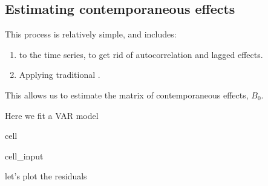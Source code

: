 \documentclass[letterpaper,10pt,english]{jupyterBook}
\begin{document}
\subsection{Estimating contemporaneous effects}
\label{\detokenize{notebooks/semiparametric_varlingam:estimating-contemporaneous-effects}}
\sphinxAtStartPar
This process is relatively simple, and includes:
\begin{enumerate}
%
\item {} 
\sphinxAtStartPar
{} to the time series, to get rid of autocorrelation and lagged effects.

\item {} 
\sphinxAtStartPar
Applying traditional .

\end{enumerate}

\sphinxAtStartPar
This allows us to estimate the matrix of contemporaneous effects, \(B_0\).

\sphinxAtStartPar
Here we fit a VAR model

\begin{sphinxuseclass}{cell}\begin{sphinxVerbatimInput}

\begin{sphinxuseclass}{cell_input}
\begin{sphinxVerbatim}[commandchars=\\\{\}]
   

  
    
  
\end{sphinxVerbatim}

\end{sphinxuseclass}\end{sphinxVerbatimInput}

\end{sphinxuseclass}
\sphinxAtStartPar
let’s plot the residuals
\end{document}
